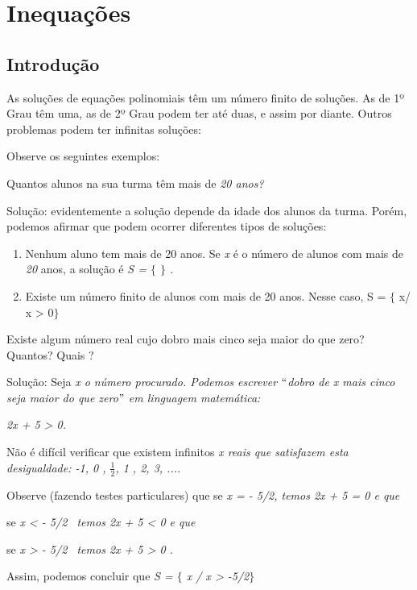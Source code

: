 \chapter{Inequações}

\section{Introdução}

As soluções de equações polinomiais têm um número finito de soluções. As de 1º Grau têm uma, as de 2º Grau podem ter até duas, e assim por diante. Outros problemas podem ter infinitas soluções:

Observe os seguintes exemplos:


\begin{texemplo}
Quantos alunos na sua turma têm mais de \textit{20 anos?}

Solução: evidentemente a solução depende da idade dos alunos da turma. Porém, podemos afirmar que podem ocorrer diferentes tipos de soluções:

\begin{enumerate}
	\item Nenhum aluno tem mais de 20 anos. Se \textit{x }é o número de alunos com mais de \textit{20} anos, a solução é \textit{S = $ \{ $ $ \} $ .}

	\item Existe um número finito de alunos com mais de 20 anos. Nesse caso, S = $ \{ $ x/ x > 0$ \} $ \qedsymbol{} 
\end{enumerate}
\end{texemplo}

\begin{texemplo}
Existe algum número real cujo dobro mais cinco seja maior do que zero? Quantos? Quais ?

Solução: Seja \textit{x o número procurado. Podemos escrever $``$dobro de x mais cinco seja maior do que zero$"$  em linguagem matemática:}

\textit{2x + 5 > 0. }

Não é difícil verificar que existem infinitos \textit{x reais que satisfazem esta desigualdade: -1, 0 , $\frac{1}{2}$, 1 , 2, 3, ....}

Observe (fazendo testes particulares) que se \textit{x = - 5/2, temos 2x + 5 = 0 e que }

se \textit{x < - 5/2~ temos 2x + 5 < 0 e que }

se \textit{x > - 5/2~ temos 2x + 5 > 0 .}

Assim, podemos concluir que \textit{S = $ \{ $ x  / x > -5/2$ \} $ \qedsymbol{}}
\end{texemplo}


